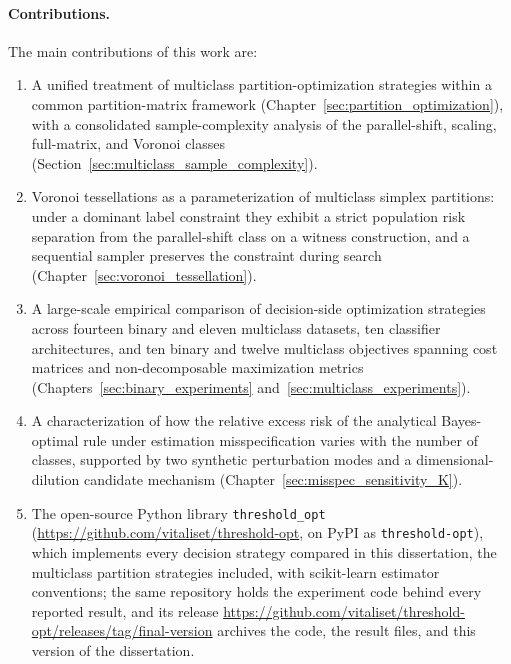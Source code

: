 \paragraph{Contributions.} The main contributions of this work are:
\begin{enumerate}
    \item A unified treatment of multiclass partition-optimization strategies within a common partition-matrix framework (Chapter~\ref{sec:partition_optimization}), with a consolidated sample-complexity analysis of the parallel-shift, scaling, full-matrix, and Voronoi classes (Section~\ref{sec:multiclass_sample_complexity}).
    \item Voronoi tessellations as a parameterization of multiclass simplex partitions: under a dominant label constraint they exhibit a strict population risk separation from the parallel-shift class on a witness construction, and a sequential sampler preserves the constraint during search (Chapter~\ref{sec:voronoi_tessellation}).
    \item A large-scale empirical comparison of decision-side optimization strategies across fourteen binary and eleven multiclass datasets, ten classifier architectures, and ten binary and twelve multiclass objectives spanning cost matrices and non-decomposable maximization metrics (Chapters~\ref{sec:binary_experiments} and~\ref{sec:multiclass_experiments}).
    \item A characterization of how the relative excess risk of the analytical Bayes-optimal rule under estimation misspecification varies with the number of classes, supported by two synthetic perturbation modes and a dimensional-dilution candidate mechanism (Chapter~\ref{sec:misspec_sensitivity_K}).
    \item The open-source Python library \texttt{threshold\_opt} (\url{https://github.com/vitaliset/threshold-opt}, on PyPI as \texttt{threshold-opt}), which implements every decision strategy compared in this dissertation, the multiclass partition strategies included, with scikit-learn estimator conventions; the same repository holds the experiment code behind every reported result, and its release \url{https://github.com/vitaliset/threshold-opt/releases/tag/final-version} archives the code, the result files, and this version of the dissertation.
\end{enumerate}

